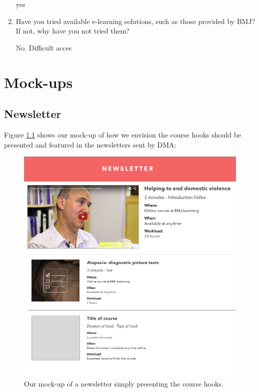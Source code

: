 \begin{appendices}
\begin{enumerate}
yes

\item Have you tried available e-learning solutions, such as those provided by BMJ? If not, why have you not tried them?

No. Difficult acces


\end{enumerate}

\chapter{Mock-ups}\label{appendix:mockups}

\section{Newsletter}
Figure \ref{fig:newsletter} shows our mock-up of how we envision the course hooks should be presented and featured in the newsletters sent by DMA:

\begin{figure}[h!]
 \begin{center}
  \includegraphics[width=1\textwidth]{figures/newsletter.png}
  \caption{Our mock-up of a newsletter simply presenting the course hooks.\label{fig:newsletter}}
 \end{center}
\end{figure}


\end{appendices}
